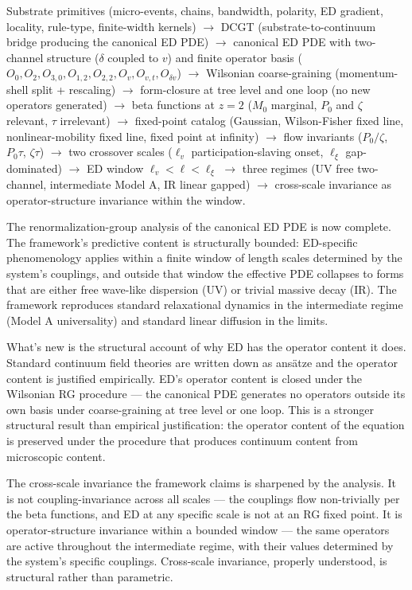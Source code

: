 \documentclass[11pt,a4paper]{article}
\begin{document}
Substrate primitives (micro-events, chains, bandwidth, polarity, ED gradient, locality, rule-type, finite-width kernels) $\to$ DCGT (substrate-to-continuum bridge producing the canonical ED PDE) $\to$ canonical ED PDE with two-channel structure ($\delta$ coupled to $v$) and finite operator basis ($O_0, O_2, O_{3,0}, O_{1,2}, O_{2,2}, O_v, O_{v,t}, O_{\delta v}$) $\to$ Wilsonian coarse-graining (momentum-shell split + rescaling) $\to$ form-closure at tree level and one loop (no new operators generated) $\to$ beta functions at $z = 2$ ($M_0$ marginal, $P_0$ and $\zeta$ relevant, $\tau$ irrelevant) $\to$ fixed-point catalog (Gaussian, Wilson-Fisher fixed line, nonlinear-mobility fixed line, fixed point at infinity) $\to$ flow invariants ($P_0/\zeta$, $P_0\tau$, $\zeta\tau$) $\to$ two crossover scales ($\ell_v$ participation-slaving onset, $\ell_\xi$ gap-dominated) $\to$ ED window $\ell_v < \ell < \ell_\xi$ $\to$ three regimes (UV free two-channel, intermediate Model A, IR linear gapped) $\to$ cross-scale invariance as operator-structure invariance within the window.

The renormalization-group analysis of the canonical ED PDE is now complete. The framework's predictive content is structurally bounded: ED-specific phenomenology applies within a finite window of length scales determined by the system's couplings, and outside that window the effective PDE collapses to forms that are either free wave-like dispersion (UV) or trivial massive decay (IR). The framework reproduces standard relaxational dynamics in the intermediate regime (Model A universality) and standard linear diffusion in the limits.

What's new is the structural account of why ED has the operator content it does. Standard continuum field theories are written down as ans\"atze and the operator content is justified empirically. ED's operator content is closed under the Wilsonian RG procedure --- the canonical PDE generates no operators outside its own basis under coarse-graining at tree level or one loop. This is a stronger structural result than empirical justification: the operator content of the equation is preserved under the procedure that produces continuum content from microscopic content.

The cross-scale invariance the framework claims is sharpened by the analysis. It is not coupling-invariance across all scales --- the couplings flow non-trivially per the beta functions, and ED at any specific scale is not at an RG fixed point. It is operator-structure invariance within a bounded window --- the same operators are active throughout the intermediate regime, with their values determined by the system's specific couplings. Cross-scale invariance, properly understood, is structural rather than parametric.
\end{document}

